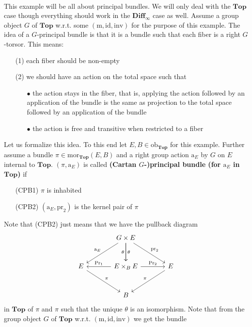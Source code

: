\\
\begin{exa}[Bundles 2]
\label{exa:bundles2}
This example will be all about principal bundles. We will only deal with the $\mathbf{Top}$ case though everything should work in the $\mathbf{Diff}_{\infty}$ case as well. Assume a group object $G$ of $\mathbf{Top}$ w.r.t. some $(\mathrm{m},\mathrm{id},\mathrm{inv})$ for the purpose of this example. The idea of a $G$-principal bundle is that it is a bundle such that each fiber is a right $G$-torsor. This means:
\begin{enumerate}
\item[(1)]
each fiber should be non-empty
\item[(2)]
we should have an action on the total space such that
\begin{enumerate}
\item[$\bullet$]
the action stays in the fiber, that is, applying the action followed by an application of the bundle is the same as projection to the total space followed by an application of the bundle
\item[$\bullet$]
the action is free and transitive when restricted to a fiber
\end{enumerate}
\end{enumerate}
Let us formalize this idea. To this end let $E,B \in \mathrm{ob}_{\mathbf{Top}}$ for this example. Further assume a bundle $\pi \in \mathrm{mor}_{\mathbf{Top}}(E,B)$ and a right group action $\mathrm{a}_{E}$ by $G$ on $E$ internal to $\mathbf{Top}$. $(\pi,\mathrm{a}_{E})$ is called \textbf{(Cartan $G$-)principal bundle (for $\mathrm{a}_{E}$ in $\mathbf{Top}$)} if
\begin{enumerate}
\item[(CPB1)]
$\pi$ is inhabited
\item[(CPB2)]
$(\mathrm{a}_{E},\mathrm{pr}_{2})$ is the kernel pair of $\pi$
\end{enumerate}
Note that (CPB2) just means that we have the pullback diagram
\[
\begin{tikzcd}[sep=large]
  &
  G
  \times
  E
  \arrow{dr}{\mathrm{pr}_{2}}
  \arrow{d}{\theta}
  \arrow[swap]{d}{\theta}
  \arrow[swap]{dl}{\mathrm{a}_{E}}
  &
  \\
  E
  \arrow{dr}{\pi}
  &
  E
  \times_{B}
  E
  \arrow{r}{\mathrm{Pr}_{2}}
  \arrow[swap]{l}{\mathrm{Pr}_{1}}
  &
  E
  \arrow[swap]{dl}{\pi}
  \\
  &
  B
  &
\end{tikzcd}
\]
in $\mathbf{Top}$ of $\pi$ and $\pi$ such that the unique $\theta$ is an isomorphism. Note that from the group object $G$ of $\mathbf{Top}$ w.r.t. $(\mathrm{m},\mathrm{id},\mathrm{inv})$ we get the bundle

\end{exa}
